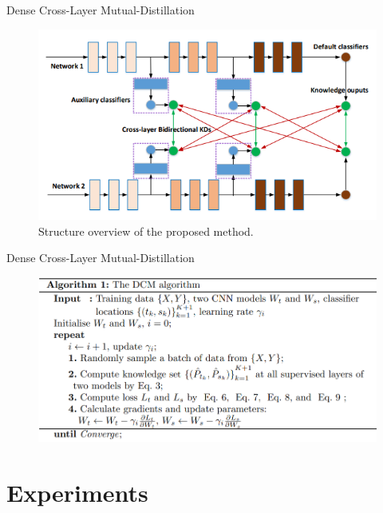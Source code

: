 \documentclass{beamer}
\begin{document}
\begin{frame}{Dense Cross-Layer Mutual-Distillation}
    \begin{figure}
        \centering
        \includegraphics[scale=0.4]{overview.png}
        \caption{Structure overview of the proposed method.}
        \label{fig:overview}
    \end{figure}
\end{frame}

\begin{frame}{Dense Cross-Layer Mutual-Distillation}
    \begin{figure}
        \centering
        \includegraphics[scale=0.3]{algorithm.png}
        \label{fig:alg}
    \end{figure}
\end{frame}

\section{Experiments}
\end{document}
